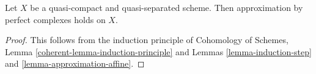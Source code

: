 \begin{theorem}
\label{theorem-approximation}
Let $X$ be a quasi-compact and quasi-separated scheme.
Then approximation by perfect complexes holds on $X$.
\end{theorem}

\begin{proof}
This follows from the induction principle of
Cohomology of Schemes, Lemma \ref{coherent-lemma-induction-principle}
and Lemmas \ref{lemma-induction-step} and \ref{lemma-approximation-affine}.
\end{proof}
